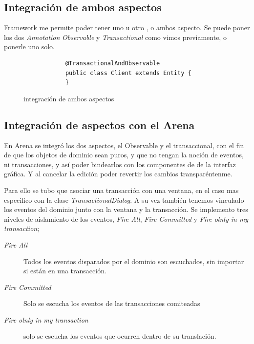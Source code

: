 \subsection{Integración de ambos aspectos } 
	Framework me permite poder tener uno u otro , o
	ambos aspecto. Se puede poner los dos \emph{Annotation} \emph{Observable} y
	\emph{Transactional} como vimos previamente, o ponerle uno solo. 
	
	\begin{figure}[h]
		\begin{lstlisting} 
			@TransactionalAndObservable
			public class Client extends Entity {
			}
		\end{lstlisting}
		\caption{integración de ambos aspectos}
		\label{TandO}
	\end{figure}  
	
	
	
\subsection{Integración de aspectos con el Arena}
	En Arena se integró los dos aspectos, el Observable y el transaccional, con el
	fin de que los objetos de dominio sean puros, y que no tengan la noción de
	eventos, ni transacciones, y así poder bindearlos con los componentes de de la
	interfaz gráfica. Y al cancelar la edición poder revertir los cambios
	transparéntenme.
	
	Para ello se tubo que asociar una transacción con una ventana, en el caso mas
	especifico con la clase \emph{TransactionalDialog}. A su vez también tenemos
	vinculado los eventos del dominio junto con la ventana y la transacción.
	Se implemento tres niveles de aislamiento de los eventos,  \emph{Fire All},
	\emph{Fire Committed} y \emph{Fire olnly in my transaction};
	
	\begin{description}
		\item[\emph{Fire All}] Todos los eventos disparados por el dominio son
		escuchados, sin importar si están en una transacción.
	
		\item[\emph{Fire Committed}] Solo se escucha los eventos de las transacciones
			comiteadas
		
		\item[\emph{Fire olnly in my transaction}] solo se escucha los eventos que
			ocurren dentro de su translación.
	
	 \end{description}
	 
